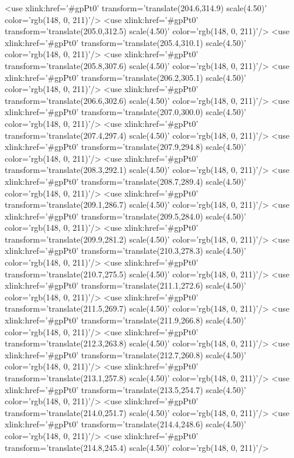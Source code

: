 	<use xlink:href='#gpPt0' transform='translate(204.6,314.9) scale(4.50)' color='rgb(148,   0, 211)'/>
	<use xlink:href='#gpPt0' transform='translate(205.0,312.5) scale(4.50)' color='rgb(148,   0, 211)'/>
	<use xlink:href='#gpPt0' transform='translate(205.4,310.1) scale(4.50)' color='rgb(148,   0, 211)'/>
	<use xlink:href='#gpPt0' transform='translate(205.8,307.6) scale(4.50)' color='rgb(148,   0, 211)'/>
	<use xlink:href='#gpPt0' transform='translate(206.2,305.1) scale(4.50)' color='rgb(148,   0, 211)'/>
	<use xlink:href='#gpPt0' transform='translate(206.6,302.6) scale(4.50)' color='rgb(148,   0, 211)'/>
	<use xlink:href='#gpPt0' transform='translate(207.0,300.0) scale(4.50)' color='rgb(148,   0, 211)'/>
	<use xlink:href='#gpPt0' transform='translate(207.4,297.4) scale(4.50)' color='rgb(148,   0, 211)'/>
	<use xlink:href='#gpPt0' transform='translate(207.9,294.8) scale(4.50)' color='rgb(148,   0, 211)'/>
	<use xlink:href='#gpPt0' transform='translate(208.3,292.1) scale(4.50)' color='rgb(148,   0, 211)'/>
	<use xlink:href='#gpPt0' transform='translate(208.7,289.4) scale(4.50)' color='rgb(148,   0, 211)'/>
	<use xlink:href='#gpPt0' transform='translate(209.1,286.7) scale(4.50)' color='rgb(148,   0, 211)'/>
	<use xlink:href='#gpPt0' transform='translate(209.5,284.0) scale(4.50)' color='rgb(148,   0, 211)'/>
	<use xlink:href='#gpPt0' transform='translate(209.9,281.2) scale(4.50)' color='rgb(148,   0, 211)'/>
	<use xlink:href='#gpPt0' transform='translate(210.3,278.3) scale(4.50)' color='rgb(148,   0, 211)'/>
	<use xlink:href='#gpPt0' transform='translate(210.7,275.5) scale(4.50)' color='rgb(148,   0, 211)'/>
	<use xlink:href='#gpPt0' transform='translate(211.1,272.6) scale(4.50)' color='rgb(148,   0, 211)'/>
	<use xlink:href='#gpPt0' transform='translate(211.5,269.7) scale(4.50)' color='rgb(148,   0, 211)'/>
	<use xlink:href='#gpPt0' transform='translate(211.9,266.8) scale(4.50)' color='rgb(148,   0, 211)'/>
	<use xlink:href='#gpPt0' transform='translate(212.3,263.8) scale(4.50)' color='rgb(148,   0, 211)'/>
	<use xlink:href='#gpPt0' transform='translate(212.7,260.8) scale(4.50)' color='rgb(148,   0, 211)'/>
	<use xlink:href='#gpPt0' transform='translate(213.1,257.8) scale(4.50)' color='rgb(148,   0, 211)'/>
	<use xlink:href='#gpPt0' transform='translate(213.5,254.7) scale(4.50)' color='rgb(148,   0, 211)'/>
	<use xlink:href='#gpPt0' transform='translate(214.0,251.7) scale(4.50)' color='rgb(148,   0, 211)'/>
	<use xlink:href='#gpPt0' transform='translate(214.4,248.6) scale(4.50)' color='rgb(148,   0, 211)'/>
	<use xlink:href='#gpPt0' transform='translate(214.8,245.4) scale(4.50)' color='rgb(148,   0, 211)'/>
